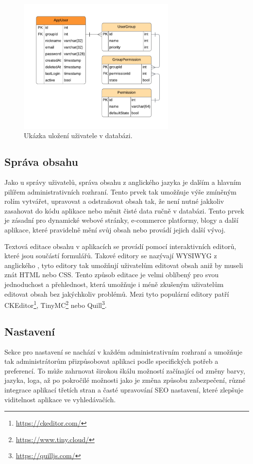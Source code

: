 \begin{figure}[H]
    \centering
    \includegraphics[width=0.7\textwidth]{diagrams/userManagement}
    \caption{Ukázka uložení uživatele v databázi. \cite{responsive_design}}
    \label{fig:user-management}
\end{figure}

\subsection{Správa obsahu}
\label{subsec:admin-elements-content-management}
Jako u správy uživatelů, správa obsahu z anglického jazyka \textit{} je dalším a hlavním pilířem administrativních rozhraní. Tento prvek tak umožňuje výše zmíněným rolím vytvářet, upravovat a odstraňovat obsah tak, že není nutné jakkoliv zasahovat do kódu aplikace nebo měnit čisté data ručně v databázi. Tento prvek je zásadní pro dynamické webové stránky, e-commerce platformy, blogy a další aplikace, které pravidelně mění svůj obsah nebo provádí jejich další vývoj.

Textová editace obsahu v aplikacích se provádí pomocí interaktivních editorů, které jsou součástí formulářů. Takové editory se nazývají WYSIWYG z anglického \textit{}, tyto editory tak umožňují uživatelům editovat obsah aniž by museli znát HTML nebo CSS. Tento způsob editace je velmi oblíbený pro svou jednoduchost a přehlednost, která umožňuje i méně zkušeným uživatelům editovat obsah bez jakýchkoliv problémů. Mezi tyto populární editory patří CKEditor\footnote[1]{\url{https://ckeditor.com/}}, TinyMC\footnote[2]{\url{https://www.tiny.cloud/}} nebo Quill\footnote[3]{\url{https://quilljs.com/}}.

\subsection{Nastavení}
\label{subsec:admin-elements-settings}
Sekce pro nastavení se nachází v každém administrativním rozhraní a umožňuje tak administrátorům přizpůsobovat aplikaci podle specifických potřeb a preferencí. To může zahrnovat širokou škálu možností začínající od změny barvy, jazyka, loga, až po pokročilé možnosti jako je změna způsobu zabezpečení, různé integrace aplikací třetích stran a časté upravování SEO nastavení, které zlepšuje viditelnost aplikace ve vyhledávačích.

